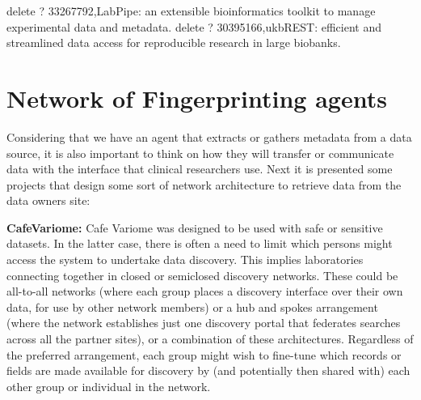 %
%
delete ? 33267792,LabPipe: an extensible bioinformatics toolkit to manage experimental data and metadata.
%
delete ? 30395166,ukbREST: efficient and streamlined data access for reproducible research in large biobanks.
%
%
%
%
%
%
%


\section{Network of Fingerprinting agents}

Considering that we have an agent that extracts or gathers metadata from a data source,
it is also important to think on how they will transfer or communicate data with the
interface that clinical researchers use.
Next it is presented some projects that design some sort of network architecture to
retrieve data from the data owners site:

\textbf{CafeVariome\cite{cafevariome}: }
Cafe Variome was designed to be used with safe or sensitive datasets.
In the latter case, there is often a need to limit which persons might access the
system to undertake data discovery.
This implies laboratories connecting together in closed or semiclosed discovery
networks.
These could be all-to-all networks (where each group places a discovery interface over
their own data, for use by other network members) or a hub and spokes arrangement
(where the network establishes just one discovery portal that federates searches across
all the partner sites), or a combination of these architectures.
Regardless of the preferred arrangement, each group might wish to fine-tune which
records or fields are made available for discovery by (and potentially then shared
with) each other group or individual in the network.

